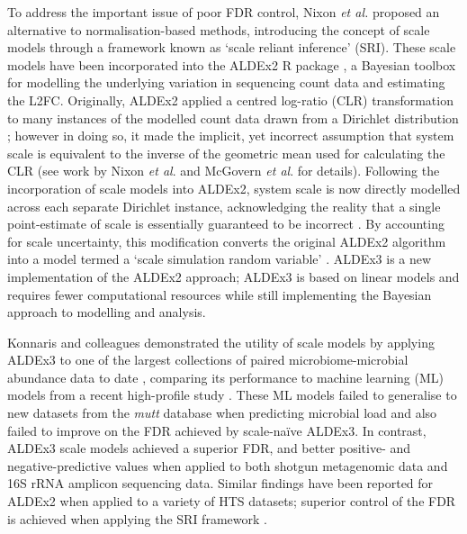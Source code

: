 \documentclass{article}
\begin{document}
To address the important issue of poor FDR control, Nixon \textit{et al.} \cite{nixon_scale_2024} proposed an alternative to normalisation-based methods, introducing the concept of scale models through a framework known as `scale reliant inference' (SRI). These scale models have  been incorporated into the ALDEx2 R package \cite{gloor_explicit_2025}, a Bayesian toolbox for modelling the underlying variation in sequencing count data and estimating the L2FC. Originally, ALDEx2 applied a centred log-ratio (CLR) transformation to many instances of the modelled count data drawn from a Dirichlet distribution \cite{fernandes:2014}; however in doing so, it made the implicit, yet incorrect assumption that system scale is equivalent to the inverse of the geometric mean used for calculating the CLR (see work by Nixon \textit{et al}. \cite{nixon_scale_2024} and McGovern \textit{et al}. \cite{mcgovern_addressing_2023} for details). Following the incorporation of scale models into ALDEx2, system scale is now directly modelled across each separate Dirichlet instance, acknowledging the reality that a single point-estimate of scale is essentially guaranteed to be incorrect \cite{gloor_explicit_2025}. By accounting for scale uncertainty, this modification converts the original ALDEx2 algorithm into a  model termed a `scale simulation random variable' \cite{nixon_scale_2024}. ALDEx3 is a new implementation of the ALDEx2 approach; ALDEx3 is based on linear models and  requires fewer computational  resources while still implementing the Bayesian approach to modelling and analysis.

Konnaris and colleagues demonstrated the utility of scale models by applying ALDEx3 to one of the largest collections of paired microbiome-microbial abundance data to date \cite{konnaris_uncertainty_2025}, comparing its performance to machine learning (ML) models from a recent high-profile study \cite{nishijima_fecal_2025}. These ML models failed to generalise to new datasets from the \textit{mutt} database \cite{konnaris_uncertainty_2025} when predicting microbial load and also failed to improve on the FDR achieved by scale-na\"ive ALDEx3. In contrast, ALDEx3 scale models achieved a superior FDR, and better positive- and negative-predictive values when applied to both shotgun metagenomic data and 16S rRNA amplicon sequencing data. Similar findings have been reported for ALDEx2 when applied to a variety of HTS datasets; superior control of the FDR is achieved when applying the SRI framework \cite{gloor_explicit_2025}.
\end{document}
